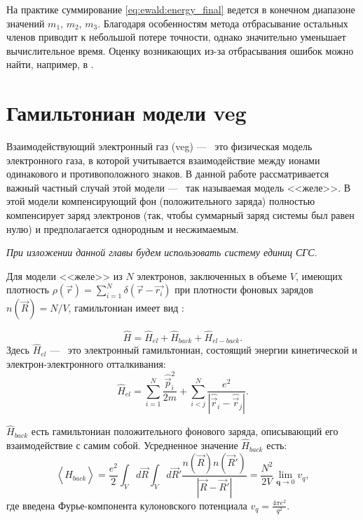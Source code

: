 На практике суммирование \eqref{eq:ewald:energy_final} ведется в конечном диапазоне значений $m_1$, $m_2$, $m_3$.
Благодаря особенностям метода отбрасывание остальных членов приводит к небольшой потере точности, однако значительно уменьшает вычислительное время.
Оценку возникающих из-за отбрасывания ошибок можно найти, например, в \cite{ewald:errors_study}.

\section{Гамильтониан модели \texorpdfstring{\acrshort{veg}}{ВЭГ}}
Взаимодействующий электронный газ (\acrshort{veg}) ---~ это физическая модель электронного газа, в которой учитывается взаимодействие между ионами одинакового и противоположного знаков.
В данной работе рассматривается важный частный случай этой модели ---~ так называемая модель <<желе>>.
В этой модели компенсирующий фон (положительного заряда) полностью компенсирует заряд электронов (так, чтобы суммарный заряд системы был равен нулю) и предполагается однородным и несжимаемым.

\textit{При изложении данной главы будем использовать систему единиц СГС.}

Для модели <<желе>> из $N$ электронов, заключенных в объеме $V$, имеющих плотность $\rho (\vec{r}) = \sum_{i=1}^{N} \delta(\vec{r}-\vec{r_i})$ при плотности фоновых зарядов $n(\vec{R}) = N/V$, гамильтониан имеет вид \cite{jel:mahan_hamiltonian}:

\begin{equation}
    \label{eq:jel:ham_four_sum}
    \hat{H}=\hat{H}_{e l}+\hat{H}_{b a c k}+\hat{H}_{e l-b a c k}.
\end{equation}
Здесь $\hat{H}_{e l}$ ---~ это электронный гамильтониан, состоящий энергии кинетической и электрон-электронного отталкивания:
\begin{equation}
    \label{eq:jel:ham_el_def}
    \hat{H}_{e l}=\sum_{i=1}^{N} \frac{\hat{\vec{p}}_i^2}{2 m}+\sum_{i<j}^{N} \frac{e^{2}}{\left|\hat{\vec{r}}_{i}-\hat{\vec{r}}_{j}\right|}.
\end{equation}

$\hat{H}_{b a c k}$ есть гамильтониан положительного фонового заряда, описывающий его взаимодействие с самим собой. Усредненное значение $\hat{H}_{b a c k}$ есть:
\begin{equation}
    \label{eq:jel:ham_back_expect}
    \left\langle\hat{H}_{b a c k}\right\rangle
    = \frac{e^{2}}{2} \int_{V} d \vec{R} \int_{V} d \vec{R}' \frac{n(\vec{R}) n\left(\vec{R}'\right)}{\left|\vec{R}-\vec{R}'\right|}
    = \frac{N^{2}}{2 V} \lim _{\mathbf{q} \rightarrow 0} v_{q},
\end{equation}
где введена Фурье-компонента кулоновского потенциала $v_{q}=\frac{4 \pi e^{2}}{q^{2}}$.

